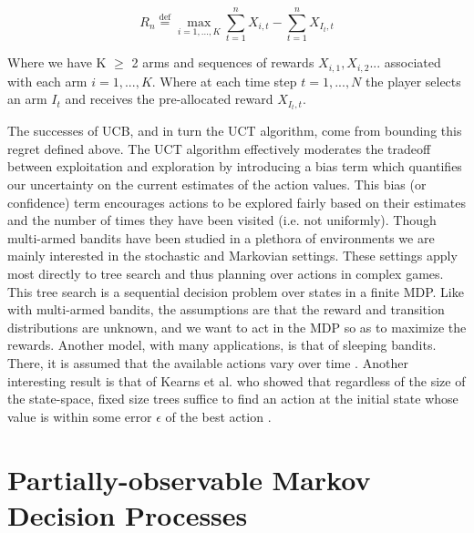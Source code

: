 \documentclass[msc, deptreport, ai, romanprepages]{infthesis}
\newcommand*{\defeq}{\stackrel{\text{def}}{=}}
\begin{document}
\begin{equation}
R_n \defeq \max_{i=1,...,K} \sum_{t=1}^n X_{i,t} - \sum_{t=1}^n X_{I_t,t}
\end{equation}

Where we have K \(\geq\) 2 arms and sequences of rewards \(X_{i,1},X_{i,2}...\) associated with each arm \( i = 1,...,K\). Where at each time step \( t=1,...,N\) the player selects an arm \(I_t\) and receives the pre-allocated reward \(X_{I_t,t}\).

The successes of UCB, and in turn the UCT algorithm, come from bounding this regret defined above. The UCT algorithm effectively moderates the tradeoff between exploitation and exploration by introducing a bias term which quantifies our uncertainty on the current estimates of the action values. This bias (or confidence) term encourages actions to be explored fairly based on their estimates and the number of times they have been visited (i.e. not uniformly).
Though multi-armed bandits have been studied in a plethora of environments we are mainly interested in the stochastic and Markovian settings. These settings apply most directly to tree search and thus planning over actions in complex games. This tree search is a sequential decision problem over states in a finite MDP. Like with multi-armed bandits, the assumptions are that the reward and transition distributions are unknown, and we want to act in the MDP so as to maximize the rewards. Another model, with many applications, is that of sleeping bandits. There, it is assumed that the available actions vary over time \cite{regretAnalysis}. Another interesting result is that of Kearns et al. who showed that regardless of the size of the state-space, fixed size trees suffice to find an action at the initial state whose value is within some error \(\epsilon\) of the best action \cite{Kearns2002}.

\section{Partially-observable Markov Decision Processes}
\end{document}
